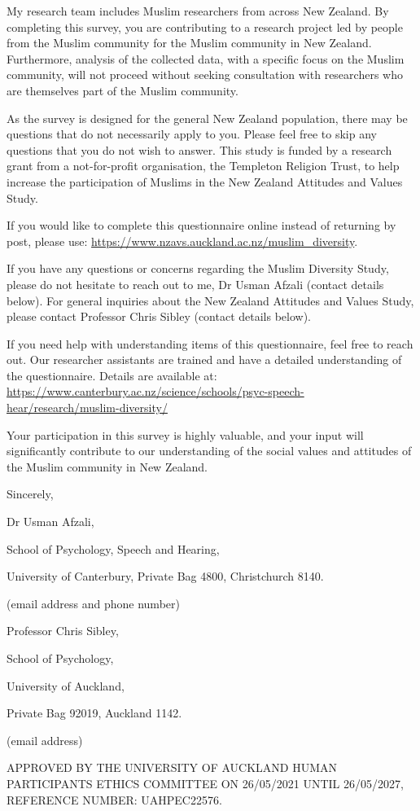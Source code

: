 \documentclass[
]{interact}
\begin{document}
\noindent My research team includes Muslim researchers from across New
Zealand. By completing this survey, you are contributing to a research
project led by people from the Muslim community for the Muslim community
in New Zealand. Furthermore, analysis of the collected data, with a
specific focus on the Muslim community, will not proceed without seeking
consultation with researchers who are themselves part of the Muslim
community.

\noindent As the survey is designed for the general New Zealand
population, there may be questions that do not necessarily apply to you.
Please feel free to skip any questions that you do not wish to answer.
This study is funded by a research grant from a not-for-profit
organisation, the Templeton Religion Trust, to help increase the
participation of Muslims in the New Zealand Attitudes and Values Study.

\begin{tcolorbox}[enhanced jigsaw, opacityback=0, toprule=.15mm, breakable, arc=.35mm, colframe=quarto-callout-color-frame, bottomrule=.15mm, rightrule=.15mm, leftrule=.75mm, left=2mm, colback=white]

If you would like to complete this questionnaire online instead of
returning by post, please use:
\url{https://www.nzavs.auckland.ac.nz/muslim_diversity}.

\end{tcolorbox}

\noindent If you have any questions or concerns regarding the Muslim
Diversity Study, please do not hesitate to reach out to me, Dr Usman
Afzali (contact details below). For general inquiries about the New
Zealand Attitudes and Values Study, please contact Professor Chris
Sibley (contact details below).

\noindent If you need help with understanding items of this
questionnaire, feel free to reach out. Our researcher assistants are
trained and have a detailed understanding of the questionnaire. Details
are available at:
\url{https://www.canterbury.ac.nz/science/schools/psyc-speech-hear/research/muslim-diversity/}

\noindent Your participation in this survey is highly valuable, and your
input will significantly contribute to our understanding of the social
values and attitudes of the Muslim community in New Zealand.

\noindent Sincerely,

Dr Usman Afzali,

School of Psychology, Speech and Hearing,

University of Canterbury, Private Bag 4800, Christchurch 8140.

(email address and phone number)

Professor Chris Sibley,

School of Psychology,

University of Auckland,

Private Bag 92019, Auckland 1142.

(email address)

\noindent APPROVED BY THE UNIVERSITY OF AUCKLAND HUMAN PARTICIPANTS
ETHICS COMMITTEE ON 26/05/2021 UNTIL 26/05/2027, REFERENCE NUMBER:
UAHPEC22576.
\end{document}
